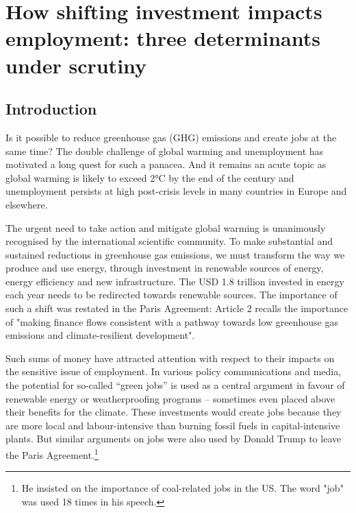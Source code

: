 \chapter{How shifting investment impacts employment: three determinants under scrutiny} \label{chap:mechanisms}

\section{Introduction} \label{Introduction}

Is it possible to reduce greenhouse gas (GHG) emissions and create jobs at the same time? The double challenge of global warming and unemployment has motivated a long quest for such a panacea. And it remains an acute topic as global warming is likely to exceed 2°C by the end of the century and unemployment persists at high post-crisis levels in many countries in Europe and elsewhere.

The urgent need to take action and mitigate global warming is unanimously recognised by the international scientific community. To make substantial and sustained reductions in greenhouse gas emissions, we must transform the way we produce and use energy, through investment in renewable sources of energy, energy efficiency and new infrastructure. The USD 1.8 trillion invested in energy each year \citep{IEAWIR2016} needs to be redirected towards renewable sources. The importance of such a shift was restated in the Paris Agreement: Article 2 recalls the importance of "making finance flows consistent with a pathway towards low greenhouse gas emissions and climate-resilient development". 

Such sums of money have attracted attention with respect to their impacts on the sensitive issue of employment. In various policy communications and media, the potential for so-called “green jobs” is used as a central argument in favour of renewable energy or weatherproofing programs – sometimes even placed above their benefits for the climate. These investments would create jobs because they are more local and labour-intensive than burning fossil fuels in capital-intensive plants. But similar arguments on jobs were also used by Donald Trump to leave the Paris Agreement.\footnote{He insisted on the importance of coal-related jobs in the US. The word "job" was used 18 times in his speech.}

